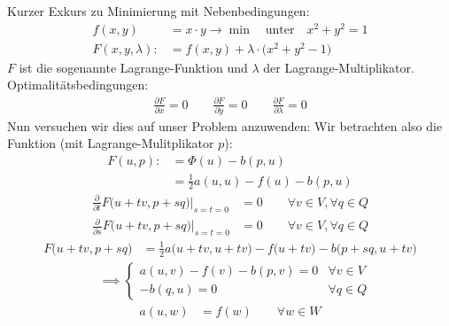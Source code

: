Kurzer Exkurs zu Minimierung mit Nebenbedingungen:
\begin{align*}
	f(x,y)&=x\cdot y\to\min\quad\text{unter}\quad x^2+y^2=1\\
	F(x,y,\lambda):&=f(x,y)+\lambda\cdot\big(x^2+y^2-1\big)
\end{align*}
$F$ ist die sogenannte Lagrange-Funktion und $\lambda$ der Lagrange-Multiplikator.\\
Optimalitätsbedingungen:
\begin{align*}
	\frac{\partial F}{\partial x}=0\qquad
	\frac{\partial F}{\partial y}=0\qquad
	\frac{\partial F}{\partial\lambda}=0
\end{align*}
Nun versuchen wir dies auf unser Problem anzuwenden:
Wir betrachten also die Funktion (mit Lagrange-Mulitplikator $p$):
\begin{align*}
	F(u,p):&=\Phi(u)-b(p,u)\\
	&=\frac{1}{2}a(u,u)-f(u)-b(p,u)
\end{align*}
\begin{align*}
	\frac{\partial}{\partial t}F\big(u+tv,p+sq\big)\Big|_{s=t=0}
	&=0
	\qquad\forall v\in V,\forall q\in Q\\
	\frac{\partial}{\partial s}F\big(u+tv,p+sq\big)\Big|_{s=t=0}
	&=0
	\qquad\forall v\in V,\forall q\in Q
\end{align*}
\begin{align*}
	F\big(u+tv,p+sq\big)
	&=\frac{1}{2}a\big(u+tv,u+tv\big)-f\big(u+tv\big)-b\big(p+sq,u+tv\big)
\end{align*}
\begin{align*}
	&\implies \left\lbrace\begin{array}{rl}
		a(u,v)-f(v)-b(p,v)=0 &\forall v\in V\\
		-b(q,u) =0 &\forall q\in Q
	\end{array}\right.
\end{align*}
 \begin{align*}
	a(u,w)&=f(w) \qquad\forall w\in W
\end{align*}

